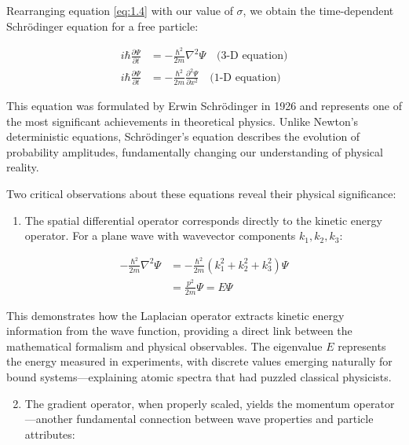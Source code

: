 \documentclass[italian]{HKNdocument}
\begin{document}
Rearranging equation \eqref{eq:1.4} with our value of $\sigma$, we obtain the time-dependent Schrödinger equation for a free particle:

\begin{align}
i \hbar \frac{\partial \Psi}{\partial t} & =-\frac{\hbar^{2}}{2 m} \nabla^{2} \Psi \quad \text{(3-D equation)} \\
i \hbar \frac{\partial \Psi}{\partial t} & =-\frac{\hbar^{2}}{2 m} \frac{\partial^{2} \Psi}{\partial x^{2}} \quad \text{(1-D equation)} \label{eq:1.7}
\end{align}

This equation was formulated by Erwin Schrödinger in 1926 and represents one of the most significant achievements in theoretical physics. Unlike Newton's deterministic equations, Schrödinger's equation describes the evolution of probability amplitudes, fundamentally changing our understanding of physical reality.

Two critical observations about these equations reveal their physical significance:

\begin{enumerate}
  \item The spatial differential operator corresponds directly to the kinetic energy operator. For a plane wave with wavevector components $k_1, k_2, k_3$:
\end{enumerate}

\begin{align}
-\frac{\hbar^{2}}{2 m} \nabla^{2} \Psi & =-\frac{\hbar^{2}}{2 m}\left(k_{1}^{2}+k_{2}^{2}+k_{3}^{2}\right) \Psi  \label{eq:1.8}\\
& =\frac{p^{2}}{2 m} \Psi=E \Psi
\end{align}

This demonstrates how the Laplacian operator extracts kinetic energy information from the wave function, providing a direct link between the mathematical formalism and physical observables. The eigenvalue $E$ represents the energy measured in experiments, with discrete values emerging naturally for bound systems—explaining atomic spectra that had puzzled classical physicists.


\begin{enumerate}
  \setcounter{enumi}{1}
  \item The gradient operator, when properly scaled, yields the momentum operator—another fundamental connection between wave properties and particle attributes:
\end{enumerate}
\end{document}

